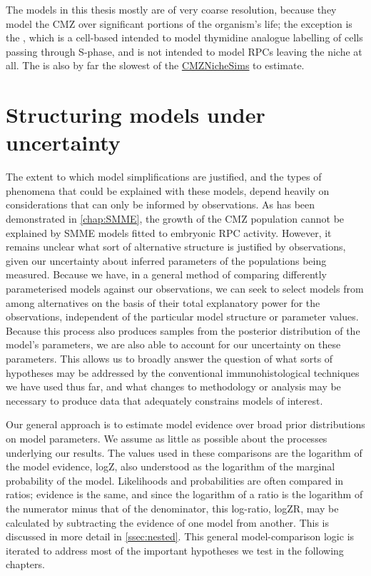 \documentclass{ut-thesis}
\begin{document}
\begin{NoHyper}
The models in this thesis mostly are of very coarse resolution, because they model the CMZ over significant portions of the organism's life; the exception is the , which is a cell-based intended to model thymidine analogue labelling of cells passing through S-phase, and is not intended to model RPCs leaving the niche at all. The  is also by far the slowest of the \hyperref[chap:CNS]{CMZNicheSims} to estimate.

\section{Structuring models under uncertainty}
The extent to which model simplifications are justified, and the types of phenomena that could be explained with these models, depend heavily on considerations that can only be informed by observations. As has been demonstrated in \autoref{chap:SMME}, the growth of the CMZ population cannot be explained by SMME models fitted to embryonic RPC activity. However, it remains unclear what sort of alternative structure is justified by observations, given our uncertainty about inferred parameters of the populations being measured. Because we have, in  a general method of comparing differently parameterised models against our observations, we can seek to select models from among alternatives on the basis of their total explanatory power for the observations, independent of the particular model structure or parameter values. Because this process also produces samples from the posterior distribution of the model's parameters, we are also able to account for our uncertainty on these parameters. This allows us to broadly answer the question of what sorts of hypotheses may be addressed by the conventional immunohistological techniques we have used thus far, and what changes to methodology or analysis may be necessary to produce data that adequately constrains models of interest.

Our general approach is to estimate model evidence over broad prior distributions on model parameters. We assume as little as possible about the processes underlying our results. The values used in these comparisons are the logarithm of the model evidence, logZ, also understood as the logarithm of the marginal probability of the model. Likelihoods and probabilities are often compared in ratios; evidence is the same, and since the logarithm of a ratio is the logarithm of the numerator minus that of the denominator, this log-ratio, logZR, may be calculated by subtracting the evidence of one model from another. This is discussed in more detail in \autoref{ssec:nested}. This general model-comparison logic is iterated to address most of the important hypotheses we test in the following chapters.

\end{NoHyper}
\end{document}
